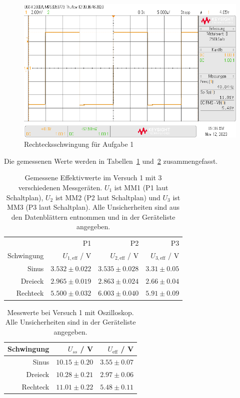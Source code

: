 \documentclass{article}
\begin{document}
\begin{figure}[H]
\centering
\caption{Rechtecksschwingung für Aufgabe 1}
\label{fig:task1_rechteck}
\includegraphics[scale=0.4]{daten/pul_3.png}
\end{figure}


Die gemessenen Werte werden in Tabellen~\ref{tab:messung_task1_volt} und~\ref{tab:messung_task1_oszi} zusammengefasst.

\begin{table}[H]
\centering
\caption{Gemessene Effektivwerte im Versuch 1 mit 3 verschiedenen Messgeräten. $U_1$ ist MM1 (P1 laut Schaltplan), $U_2$ ist MM2 (P2 laut Schaltplan) und $U_3$ ist MM3 (P3 laut Schaltplan). Alle Unsicherheiten sind aus den Datenblättern entnommen und in der Geräteliste angegeben.}
\label{tab:messung_task1_volt}
\begin{tabular}{r|rrr}
& P1 & P2 & P3 \\
Schwingung & $U_{1,\text{eff}}$ / V  & $U_{2,\text{eff}}$ / V & $U_{3,\text{eff}}$ / V \\
\hline
Sinus & $3.532\pm 0.022$ & $3.535 \pm 0.028$ & $3.31 \pm 0.05$ \\
Dreieck & $2.965\pm 0.019$ & $2.863 \pm 0.024$ & $2.66 \pm 0.04$ \\
Rechteck & $5.500\pm 0.032$ & $6.003 \pm 0.040$ & $5.91 \pm 0.09$
\end{tabular}
\end{table}


\begin{table}[H]
\centering
\caption{Messwerte bei Versuch 1 mit Oszilloskop. Alle Unsicherheiten sind in der Geräteliste angegeben.}
\label{tab:messung_task1_oszi}
\begin{tabular}{r|rr}
Schwingung &  $U_{ss}$ / V &  $U_\text{eff}$ / V  \\
\hline
Sinus & $10.15 \pm 0.20$ & $3.55 \pm 0.07$ \\
Dreieck & $10.28 \pm 0.21$ & $2.97 \pm 0.06$ \\
Rechteck & $11.01 \pm 0.22$ & $5.48 \pm 0.11$
\end{tabular}
\end{table}
\end{document}
